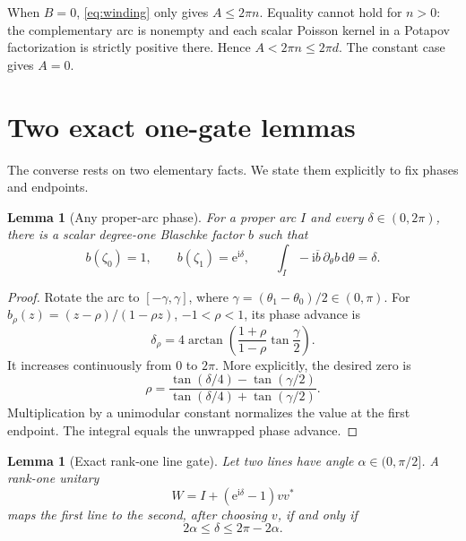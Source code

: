 \documentclass[11pt]{article}
\newtheorem{lemma}[theorem]{Lemma}
\theoremstyle{definition}
\theoremstyle{remark}
\newcommand{\dd}{\mathrm d}
\newcommand{\e}{\mathrm e}
\begin{document}
When $B=0$, \eqref{eq:winding} only gives $A\le2\pi n$.  Equality cannot
hold for $n>0$: the complementary arc is nonempty and each scalar Poisson
kernel in a Potapov factorization is strictly positive there.  Hence
$A<2\pi n\le2\pi d$.  The constant case gives $A=0$.

\section{Two exact one-gate lemmas}

The converse rests on two elementary facts.  We state them explicitly to
fix phases and endpoints.

\begin{lemma}[Any proper-arc phase]\label{lem:phase}
For a proper arc $I$ and every $\delta\in(0,2\pi)$, there is a scalar
degree-one Blaschke factor $b$ such that
\[
 b(\zeta_0)=1,
 \qquad b(\zeta_1)=\e^{\mathrm i\delta},
 \qquad \int_I-\mathrm i\overline b\,\partial_\theta b\,\dd\theta=\delta.
\]
\end{lemma}

\begin{proof}
Rotate the arc to $[-\gamma,\gamma]$, where
$\gamma=(\theta_1-\theta_0)/2\in(0,\pi)$.  For
$b_\rho(z)=(z-\rho)/(1-\rho z)$, $-1<\rho<1$, its phase advance is
\begin{equation}\label{eq:phaseformula}
 \delta_\rho=4\arctan\left(
 \frac{1+\rho}{1-\rho}\tan\frac{\gamma}{2}\right).
\end{equation}
It increases continuously from $0$ to $2\pi$.  More explicitly, the desired
zero is
\begin{equation}\label{eq:rhofromdelta}
 \rho=
 \frac{\tan(\delta/4)-\tan(\gamma/2)}
      {\tan(\delta/4)+\tan(\gamma/2)}.
\end{equation}
Multiplication by a unimodular constant normalizes the value at the first
endpoint.  The integral equals the unwrapped phase advance.
\end{proof}

\begin{lemma}[Exact rank-one line gate]\label{lem:gate}
Let two lines have angle $\alpha\in(0,\pi/2]$.  A rank-one unitary
\[
 W=I+(\e^{\mathrm i\delta}-1)vv^*
\]
maps the first line to the second, after choosing $v$, if and only if
\begin{equation}\label{eq:gateinterval}
 2\alpha\le\delta\le2\pi-2\alpha.
\end{equation}
\end{lemma}
\end{document}
